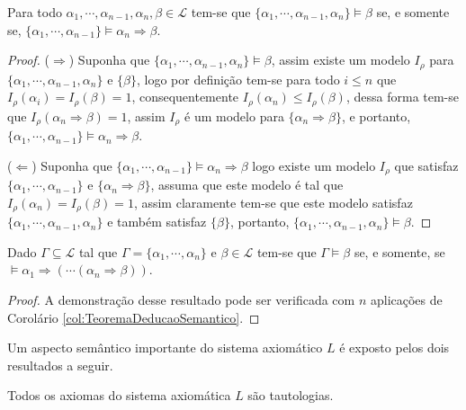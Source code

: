 \begin{corolario}\label{col:TeoremaDeducaoSemantico}
  Para todo $\alpha_1, \cdots, \alpha_{n-1}, \alpha_n, \beta \in \mathcal{L}$ tem-se que $\{\alpha_1, \cdots, \alpha_{n-1}, \alpha_n\} \vDash \beta$ se, e somente se, $\{\alpha_1, \cdots, \alpha_{n-1}\} \vDash \alpha_n \Rightarrow \beta$.
\end{corolario}

\begin{proof}
  ($\Rightarrow$) Suponha que $\{\alpha_1, \cdots, \alpha_{n-1}, \alpha_n\} \vDash \beta$, assim existe um modelo $I_\rho$ para $\{\alpha_1, \cdots, \alpha_{n-1}, \alpha_n\}$ e $\{\beta\}$, logo por definição tem-se para todo $i \leq n$ que $I_\rho(\alpha_i) = I_\rho(\beta) = 1$, consequentemente $I_\rho(\alpha_n) \leq I_\rho(\beta)$, dessa forma tem-se que $I_\rho(\alpha_n \Rightarrow \beta) = 1$, assim $I_\rho$ é um modelo para $\{\alpha_n \Rightarrow \beta\}$, e portanto, $\{\alpha_1, \cdots, \alpha_{n-1}\} \vDash \alpha_n \Rightarrow \beta$.
  
  ($\Leftarrow$) Suponha que  $\{\alpha_1, \cdots, \alpha_{n-1}\} \vDash \alpha_n \Rightarrow \beta$ logo existe um modelo $I_\rho$ que satisfaz $\{\alpha_1, \cdots, \alpha_{n-1}\} $ e $\{\alpha_n \Rightarrow \beta\}$, assuma que este modelo é tal que $I_\rho(\alpha_n) = I_\rho(\beta) = 1$, assim claramente tem-se que este modelo satisfaz $\{\alpha_1, \cdots, \alpha_{n-1}, \alpha_n\}$ e também satisfaz $\{\beta\}$, portanto, $\{\alpha_1, \cdots, \alpha_{n-1}, \alpha_n\} \vDash \beta$.
\end{proof}

\begin{proposicao}\label{prop:DeducaoSemantica}
  Dado $\Gamma \subseteq \mathcal{L}$ tal que $\Gamma = \{\alpha_1, \cdots, \alpha_n\}$ e $\beta \in \mathcal{L}$ tem-se que $\Gamma \vDash \beta$ se, e somente, se $\vDash \alpha_1 \Rightarrow ( \cdots ( \alpha_n \Rightarrow \beta))$.
\end{proposicao}

\begin{proof}
  A demonstração desse resultado pode ser verificada com $n$ aplicações de Corolário \ref{col:TeoremaDeducaoSemantico}.
\end{proof}

Um aspecto semântico importante do sistema axiomático $L$ é exposto pelos dois resultados a seguir.

\begin{teorema}\label{teo:AxiomasTautologiaEmL}
  Todos os axiomas do sistema axiomática $L$ são tautologias.
\end{teorema}

